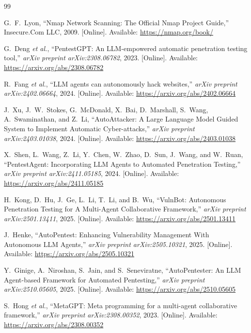 \documentclass[sigconf,anonymous]{acmart}
\begin{document}

\begin{thebibliography}{99}

G.~F.~Lyon, ``Nmap Network Scanning: The Official Nmap Project Guide,''
Insecure.Com LLC, 2009. [Online]. Available: \url{https://nmap.org/book/}

G.~Deng \emph{et al.}, ``PentestGPT: An LLM-empowered automatic penetration testing tool,''
\emph{arXiv preprint arXiv:2308.06782}, 2023. [Online]. Available: \url{https://arxiv.org/abs/2308.06782}

R.~Fang \emph{et al.}, ``LLM agents can autonomously hack websites,''
\emph{arXiv preprint arXiv:2402.06664}, 2024. [Online]. Available: \url{https://arxiv.org/abs/2402.06664}

J.~Xu, J.~W.~Stokes, G.~McDonald, X.~Bai, D.~Marshall, S.~Wang, A.~Swaminathan, and Z.~Li,
``AutoAttacker: A Large Language Model Guided System to Implement Automatic Cyber-attacks,''
\emph{arXiv preprint arXiv:2403.01038}, 2024. [Online]. Available: \url{https://arxiv.org/abs/2403.01038}

X.~Shen, L.~Wang, Z.~Li, Y.~Chen, W.~Zhao, D.~Sun, J.~Wang, and W.~Ruan,
``PentestAgent: Incorporating LLM Agents to Automated Penetration Testing,''
\emph{arXiv preprint arXiv:2411.05185}, 2024. [Online]. Available: \url{https://arxiv.org/abs/2411.05185}

H.~Kong, D.~Hu, J.~Ge, L.~Li, T.~Li, and B.~Wu,
``VulnBot: Autonomous Penetration Testing for A Multi-Agent Collaborative Framework,''
\emph{arXiv preprint arXiv:2501.13411}, 2025. [Online]. Available: \url{https://arxiv.org/abs/2501.13411}

J.~Henke,
``AutoPentest: Enhancing Vulnerability Management With Autonomous LLM Agents,''
\emph{arXiv preprint arXiv:2505.10321}, 2025. [Online]. Available: \url{https://arxiv.org/abs/2505.10321}

Y.~Ginige, A.~Niroshan, S.~Jain, and S.~Seneviratne, ``AutoPentester: An LLM Agent-based Framework for Automated Pentesting,''
\emph{arXiv preprint arXiv:2510.05605}, 2025. [Online]. Available: \url{https://arxiv.org/abs/2510.05605}

S.~Hong \emph{et al.}, ``MetaGPT: Meta programming for a multi-agent collaborative framework,''
\emph{arXiv preprint arXiv:2308.00352}, 2023. [Online]. Available: \url{https://arxiv.org/abs/2308.00352}


\end{thebibliography}
\end{document}
